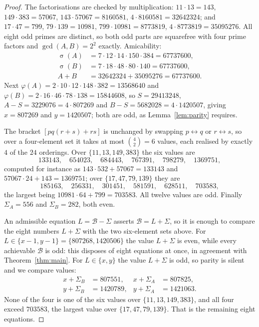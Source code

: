 \documentclass[11pt]{amsart}
\theoremstyle{remark}
\DeclareMathOperator{\sig}{\sigma}
\begin{document}
\begin{proof}
The factorisations are checked by multiplication: $11\cdot13=143$,
$149\cdot383=57067$, $143\cdot57067=8160581$, $4\cdot8160581=32642324$; and
$17\cdot47=799$, $79\cdot139=10981$, $799\cdot10981=8773819$,
$4\cdot8773819=35095276$. All eight odd primes are distinct, so both odd parts
are squarefree with four prime factors and $\gcd(A,B)=2^2$ exactly. Amicability:
\begin{align*}
 \sig(A)&=7\cdot12\cdot14\cdot150\cdot384=67737600,\\
 \sig(B)&=7\cdot18\cdot48\cdot80\cdot140=67737600,\\
 A+B&=32642324+35095276=67737600 .
\end{align*}
Next $\varphi(A)=2\cdot10\cdot12\cdot148\cdot382=13568640$ and
$\varphi(B)=2\cdot16\cdot46\cdot78\cdot138=15844608$, so $S=29413248$,
$A-S=3229076=4\cdot807269$ and $B-S=5682028=4\cdot1420507$, giving
$x=807269$ and $y=1420507$; both are odd, as Lemma~\ref{lem:parity} requires.

The bracket $[pq(r+s)+rs]$ is unchanged by swapping $p\leftrightarrow q$ or
$r\leftrightarrow s$, so over a four-element set it takes at most
$\binom{4}{2}=6$ values, each realised by exactly $4$ of the $24$ orderings.
Over $\{11,13,149,383\}$ the six values are
\[
 133143,\quad 654023,\quad 684443,\quad 767391,\quad 798279,\quad 1369751,
\]
computed for instance as $143\cdot532+57067=133143$ and
$57067\cdot24+143=1369751$; over $\{17,47,79,139\}$ they are
\[
 185163,\quad 256331,\quad 301451,\quad 581591,\quad 628511,\quad 703583,
\]
the largest being $10981\cdot64+799=703583$. All twelve values are odd. Finally
$\Sigma_A=556$ and $\Sigma_B=282$, both even.

An admissible equation $L=\mathcal B-\Sigma$ asserts $\mathcal B=L+\Sigma$, so it
is enough to compare the eight numbers $L+\Sigma$ with the two six-element sets
above. For $L\in\{x-1,y-1\}=\{807268,1420506\}$ the value $L+\Sigma$ is even,
while every achievable $\mathcal B$ is odd: this disposes of eight equations at
once, in agreement with Theorem~\ref{thm:main}. For $L\in\{x,y\}$ the value
$L+\Sigma$ is odd, so parity is silent and we compare values:
\begin{align*}
 x+\Sigma_B&=807551, & x+\Sigma_A&=807825,\\
 y+\Sigma_B&=1420789, & y+\Sigma_A&=1421063 .
\end{align*}
None of the four is one of the six values over $\{11,13,149,383\}$, and all four
exceed $703583$, the largest value over $\{17,47,79,139\}$. That is the
remaining eight equations.
\end{proof}
\end{document}
